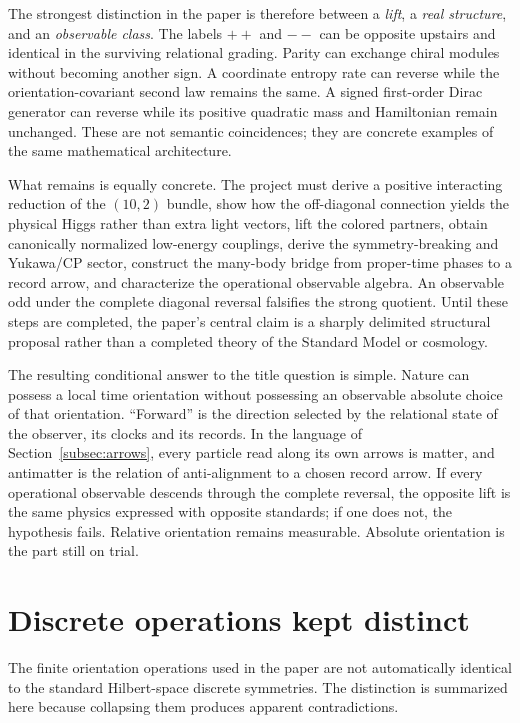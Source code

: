 \documentclass[11pt]{article}
\theoremstyle{definition}\newtheorem{definition}[theorem]{Definition}
\theoremstyle{remark}\newtheorem{remark}[theorem]{Remark}\newtheorem{conjecture}[theorem]{Conjecture}
\begin{document}
The strongest distinction in the paper is therefore between a \emph{lift}, a \emph{real structure}, and an \emph{observable class}. The labels $++$ and $--$ can be opposite upstairs and identical in the surviving relational grading. Parity can exchange chiral modules without becoming another sign. A coordinate entropy rate can reverse while the orientation-covariant second law remains the same. A signed first-order Dirac generator can reverse while its positive quadratic mass and Hamiltonian remain unchanged. These are not semantic coincidences; they are concrete examples of the same mathematical architecture.

What remains is equally concrete. The project must derive a positive interacting reduction of the $(10,2)$ bundle, show how the off-diagonal connection yields the physical Higgs rather than extra light vectors, lift the colored partners, obtain canonically normalized low-energy couplings, derive the symmetry-breaking and Yukawa/CP sector, construct the many-body bridge from proper-time phases to a record arrow, and characterize the operational observable algebra. An observable odd under the complete diagonal reversal falsifies the strong quotient. Until these steps are completed, the paper's central claim is a sharply delimited structural proposal rather than a completed theory of the Standard Model or cosmology.

The resulting conditional answer to the title question is simple. Nature can possess a local time orientation without possessing an observable absolute choice of that orientation. ``Forward'' is the direction selected by the relational state of the observer, its clocks and its records. In the language of Section~\ref{subsec:arrows}, every particle read along its own arrows is matter, and antimatter is the relation of anti-alignment to a chosen record arrow. If every operational observable descends through the complete reversal, the opposite lift is the same physics expressed with opposite standards; if one does not, the hypothesis fails. Relative orientation remains measurable. Absolute orientation is the part still on trial.

\appendix
\section{Discrete operations kept distinct}\label{app:discrete}
The finite orientation operations used in the paper are not automatically identical to the standard Hilbert-space discrete symmetries. The distinction is summarized here because collapsing them produces apparent contradictions.
\end{document}
